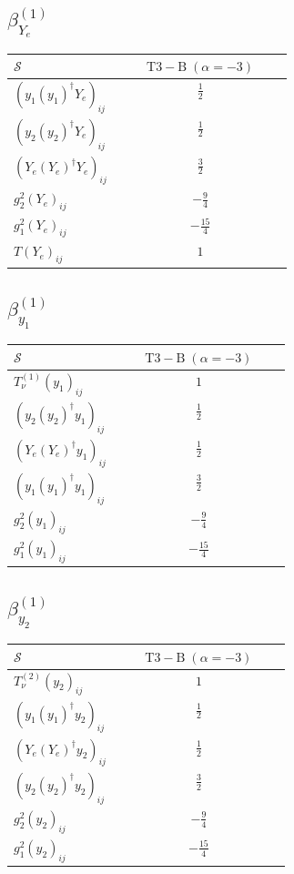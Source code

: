 \documentclass[9pt]{article}
\begin{document}
\subsection*{$ \beta_{Y_e}^{(1)} $}
\begin{longtable}{@{}p{0.38\linewidth}c@{}}
\toprule
$\mathcal{S}$ & $ \mathrm{T3-B}\;(\alpha=-3) $ \\
\midrule
$ (y_1 (y_1)^{\dagger} Y_e)_{ij} $ & $ \frac{1}{2} $ \\
$ (y_2 (y_2)^{\dagger} Y_e)_{ij} $ & $ \frac{1}{2} $ \\
$ (Y_e (Y_e)^{\dagger} Y_e)_{ij} $ & $ \frac{3}{2} $ \\
$ g_2^2 (Y_e)_{ij} $ & $ - \frac{9}{4} $ \\
$ g_1^2 (Y_e)_{ij} $ & $ - \frac{15}{4} $ \\
$ T (Y_e)_{ij} $ & $ 1 $ \\
\bottomrule
\end{longtable}
\subsection*{$ \beta_{y_1}^{(1)} $}
\begin{longtable}{@{}p{0.38\linewidth}c@{}}
\toprule
$\mathcal{S}$ & $ \mathrm{T3-B}\;(\alpha=-3) $ \\
\midrule
$ T_{\nu}^{(1)} (y_1)_{ij} $ & $ 1 $ \\
$ (y_2 (y_2)^{\dagger} y_1)_{ij} $ & $ \frac{1}{2} $ \\
$ (Y_e (Y_e)^{\dagger} y_1)_{ij} $ & $ \frac{1}{2} $ \\
$ (y_1 (y_1)^{\dagger} y_1)_{ij} $ & $ \frac{3}{2} $ \\
$ g_2^2 (y_1)_{ij} $ & $ - \frac{9}{4} $ \\
$ g_1^2 (y_1)_{ij} $ & $ - \frac{15}{4} $ \\
\bottomrule
\end{longtable}
\subsection*{$ \beta_{y_2}^{(1)} $}
\begin{longtable}{@{}p{0.38\linewidth}c@{}}
\toprule
$\mathcal{S}$ & $ \mathrm{T3-B}\;(\alpha=-3) $ \\
\midrule
$ T_{\nu}^{(2)} (y_2)_{ij} $ & $ 1 $ \\
$ (y_1 (y_1)^{\dagger} y_2)_{ij} $ & $ \frac{1}{2} $ \\
$ (Y_e (Y_e)^{\dagger} y_2)_{ij} $ & $ \frac{1}{2} $ \\
$ (y_2 (y_2)^{\dagger} y_2)_{ij} $ & $ \frac{3}{2} $ \\
$ g_2^2 (y_2)_{ij} $ & $ - \frac{9}{4} $ \\
$ g_1^2 (y_2)_{ij} $ & $ - \frac{15}{4} $ \\
\bottomrule
\end{longtable}
\end{document}
